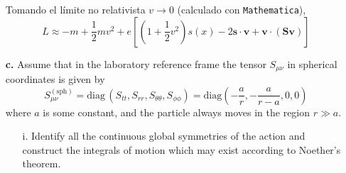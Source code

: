 \documentclass[]{article}
\numberwithin{equation}{section}
\newcommand{\0}{\textcolor{gray}{0}}
\newcommand{\n}[1]{\mathbf{#1}}
\begin{document}
\begin{enumerate}
	Tomando el límite no relativista \(v \rightarrow 0\) (calculado con \texttt{Mathematica}),
	\begin{equation}
		L \approx - m + \frac{1}{2} m v^2 + e \left[\left(1 + \frac{1}{2} v^2 \right) s(x) - 2\n{s}\cdot\n{v} + \n{v} \cdot \left(\n{S} \n{v}\right)\right]
	\end{equation}
	
	\item[\textbf{c.}] Assume that in the laboratory reference frame the tensor \(S_{\mu\nu}\) in spherical coordinates is given by
	\begin{equation*}
		S_{\mu\nu}^{\mathrm{(sph)}} = \mathrm{diag} \, (S_{tt}, S_{rr}, S_{\theta\theta}, S_{\phi\phi}) = \mathrm{diag} \left(- \frac{a}{r}, - \frac{a}{r - a}, 0, 0\right)
	\end{equation*}
	where \(a\) is some constant, and the particle always moves in the region \(r \gg a\).
	\begin{enumerate}
		\item[i.] Identify all the continuous global symmetries of the action and construct the integrals of motion which may exist according to Noether's theorem.
		

\end{enumerate}
\end{enumerate}
\end{document}
